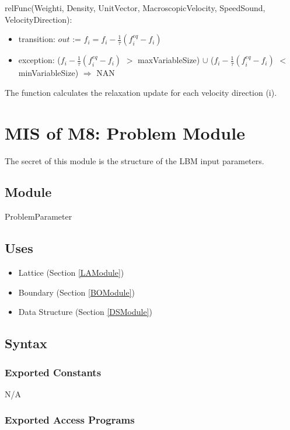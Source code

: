 \documentclass[12pt, titlepage]{article}
\begin{document}
\noindent relFunc(Weighti, Density, UnitVector, MacroscopicVelocity, SpeedSound, VelocityDirection):
\begin{itemize}
	\item transition: $out$ := $f_{i} = f_{i} - \frac{1}{\tau}(f_{i}^{eq}-f_{i})$
	\item exception: ($f_{i} - \frac{1}{\tau}(f_{i}^{eq}-f_{i})$ $>$ maxVariableSize) $\cup$ ($f_{i} - \frac{1}{\tau}(f_{i}^{eq}-f_{i})$ $<$ minVariableSize) $\Rightarrow$ NAN
\end{itemize}

The function calculates the relaxation update for each velocity direction (i).\\

\newpage

\section{MIS of M8: Problem Module} \label{PRModule}

The secret of this module is the structure of the LBM input parameters.

\subsection{Module}

ProblemParameter

\subsection{Uses}

\begin{itemize}
	\item Lattice (Section \ref{LAModule})
	\item Boundary (Section \ref{BOModule})
	\item Data Structure (Section \ref{DSModule})
\end{itemize}

\subsection{Syntax}

\subsubsection{Exported Constants}
N/A

\subsubsection{Exported Access Programs}
\end{document}
